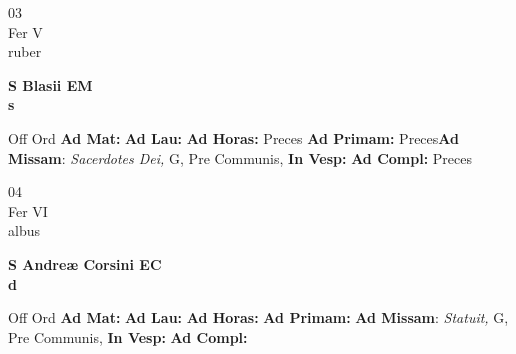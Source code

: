 \documentclass[10pt, openany]{book}
\begin{document}
    \begin{center}
        \begin{minipage}{3.5in}
            \vspace{2em}
            \begin{minipage}{0.5in}
                {\Huge 03} \\
                {\normalsize Fer V} \\
                {\normalsize ruber}
            \end{minipage}
            \begin{minipage}{3.0in}
                \textbf{ \large S Blasii EM \\
                \textnormal{\normalsize s}} \\ 
            \end{minipage}
            \begin{justify}Off Ord
                \textbf{Ad Mat: }
                \textbf{Ad Lau: }
                \textbf{Ad Horas: }Preces
                \textbf{Ad Primam: }Preces\textbf{Ad Missam}: \textit{Sacerdotes Dei,} G, Pre Communis,  
                \textbf{In Vesp: }
                \textbf{Ad Compl: }Preces
            \end{justify}
        \end{minipage}
    \end{center}

    \begin{center}
        \begin{minipage}{3.5in}
            \vspace{2em}
            \begin{minipage}{0.5in}
                {\Huge 04} \\
                {\normalsize Fer VI} \\
                {\normalsize albus}
            \end{minipage}
            \begin{minipage}{3.0in}
                \textbf{ \large S Andreæ Corsini EC \\
                \textnormal{\normalsize d}} \\ 
            \end{minipage}
            \begin{justify}Off Ord
                \textbf{Ad Mat: }
                \textbf{Ad Lau: }
                \textbf{Ad Horas: }
                \textbf{Ad Primam: }\textbf{Ad Missam}: \textit{Statuit,} G, Pre Communis,  
                \textbf{In Vesp: }
                \textbf{Ad Compl: }
            \end{justify}
        \end{minipage}
    \end{center}
\end{document}

